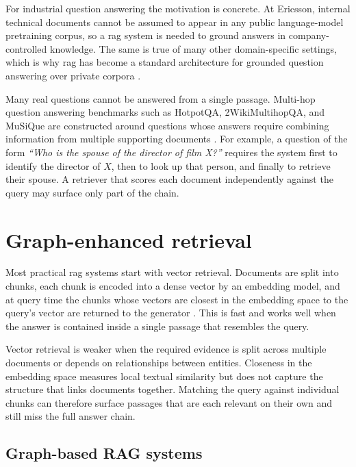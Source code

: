 \documentclass[english, bibtex]{kththesis}               %
\numberwithin{listing}{chapter}
\begin{document}
For industrial question answering the motivation is concrete. At Ericsson, internal technical documents cannot be assumed to appear in any public language-model pretraining corpus, so a \gls{rag} system is needed to ground answers in company-controlled knowledge. The same is true of many other domain-specific settings, which is why \gls{rag} has become a standard architecture for grounded question answering over private corpora \cite{gao2023ragsurvey}.

Many real questions cannot be answered from a single passage. Multi-hop question answering benchmarks such as HotpotQA, 2WikiMultihopQA, and MuSiQue are constructed around questions whose answers require combining information from multiple supporting documents \cite{ho2020twowiki,yang2018hotpotqa,trivedi2022musique}. For example, a question of the form \emph{``Who is the spouse of the director of film X?''} requires the system first to identify the director of \(X\), then to look up that person, and finally to retrieve their spouse. A retriever that scores each document independently against the query may surface only part of the chain.

\section{Graph-enhanced retrieval}
\label{sec:backgroundHybridGraph}

Most practical \gls{rag} systems start with vector retrieval. Documents are split into chunks, each chunk is encoded into a dense vector by an embedding model, and at query time the chunks whose vectors are closest in the embedding space to the query's vector are returned to the generator \cite{lewis2020rag,karpukhin2020dpr}. This is fast and works well when the answer is contained inside a single passage that resembles the query.

Vector retrieval is weaker when the required evidence is split across multiple documents or depends on relationships between entities. Closeness in the embedding space measures local textual similarity but does not capture the structure that links documents together. Matching the query against individual chunks can therefore surface passages that are each relevant on their own and still miss the full answer chain.

\subsection{Graph-based RAG systems}
\label{sec:backgroundGraphSystems}
\end{document}
